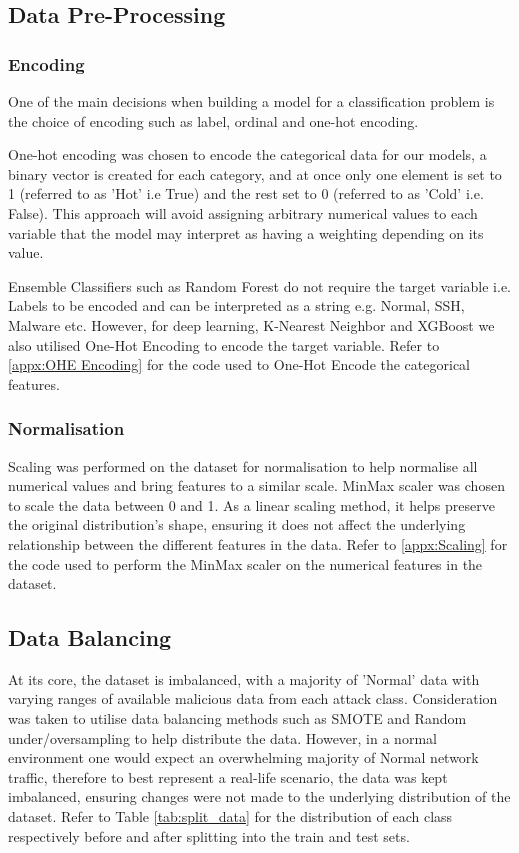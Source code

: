 \subsection{Data Pre-Processing}

\subsubsection{Encoding}

One of the main decisions when building a model for a classification problem is the choice of encoding such as label, ordinal and one-hot encoding.

One-hot encoding was chosen to encode the categorical data for our models, a binary vector is created for each category, and at once only one element is set to 1 (referred to as 'Hot' i.e True) and the rest set to 0 (referred to as 'Cold' i.e. False). This approach will avoid assigning arbitrary numerical values to each variable that the model may interpret as having a weighting depending on its value. 

Ensemble Classifiers such as Random Forest do not require the target variable i.e. Labels to be encoded and can be interpreted as a string e.g. Normal, SSH, Malware etc. However, for deep learning, K-Nearest Neighbor and XGBoost we also utilised One-Hot Encoding to encode the target variable. Refer to \ref{appx:OHE Encoding} for the code used to One-Hot Encode the categorical features. 


\subsubsection{Normalisation}

Scaling was performed on the dataset for normalisation to help normalise all numerical values and bring features to a similar scale. MinMax scaler was chosen to scale the data between 0 and 1. As a linear scaling method, it helps preserve the original distribution's shape, ensuring it does not affect the underlying relationship between the different features in the data. Refer to \ref{appx:Scaling} for the code used to perform the MinMax scaler on the numerical features in the dataset.

\subsection{Data Balancing}

At its core, the dataset is imbalanced, with a majority of 'Normal' data with varying ranges of available malicious data from each attack class. Consideration was taken to utilise data balancing methods such as SMOTE and Random under/oversampling to help distribute the data. However, in a normal environment one would expect an overwhelming majority of Normal network traffic, therefore to best represent a real-life scenario, the data was kept imbalanced, ensuring changes were not made to the underlying distribution of the dataset. Refer to Table \ref{tab:split_data} for the distribution of each class respectively before and after splitting into the train and test sets.


